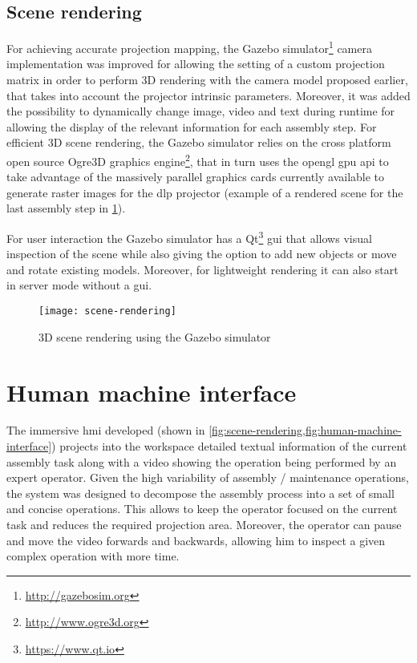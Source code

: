 \subsection{Scene rendering}

For achieving accurate projection mapping, the Gazebo simulator\footnote{\url{http://gazebosim.org}} camera implementation was improved for allowing the setting of a custom projection matrix in order to perform 3D rendering with the camera model proposed earlier, that takes into account the projector intrinsic parameters. Moreover, it was added the possibility to dynamically change image, video and text during runtime for allowing the display of the relevant information for each assembly step.
For efficient 3D scene rendering, the Gazebo simulator relies on the cross platform open source Ogre3D graphics engine\footnote{\url{http://www.ogre3d.org}}, that in turn uses the \gls{opengl} \gls{gpu} \gls{api} to take advantage of the massively parallel graphics cards currently available to generate raster images for the \gls{dlp} projector (example of a rendered scene for the last assembly step in \cref{fig:scene-rendering}).

For user interaction the Gazebo simulator has a Qt\footnote{\url{https://www.qt.io}} \gls{gui} that allows visual inspection of the scene while also giving the option to add new objects or move and rotate existing models. Moreover, for lightweight rendering it can also start in server mode without a \gls{gui}.

\begin{figure}[ht]
	\centering
	\texttt{[image: scene-rendering]}
	\caption{3D scene rendering using the Gazebo simulator}
	\label{fig:scene-rendering}
\end{figure}



\section{Human machine interface}\label{sec:human-machine-interaction}

The immersive \gls{hmi} developed (shown in \cref{fig:scene-rendering,fig:human-machine-interface}) projects into the workspace detailed textual information of the current assembly task along with a video showing the operation being performed by an expert operator. Given the high variability of assembly / maintenance operations, the system was designed to decompose the assembly process into a set of small and concise operations. This allows to keep the operator focused on the current task and reduces the required projection area. Moreover, the operator can pause and move the video forwards and backwards, allowing him to inspect a given complex operation with more time.

